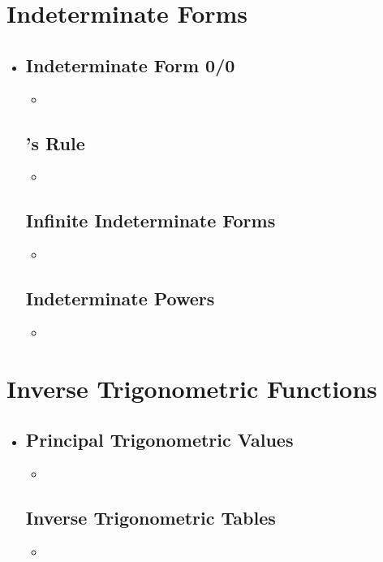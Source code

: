 \section{Indeterminate Forms}
\begin{itemize}
  \item []

  \subsection{Indeterminate Form 0/0}
  \begin{itemize}
    \item 
  \end{itemize}

  \subsection{\hopital's Rule}
  \begin{itemize}
    \item 
  \end{itemize}

  \subsection{Infinite Indeterminate Forms}
  \begin{itemize}
    \item 
  \end{itemize}
  
  \subsection{Indeterminate Powers}
  \begin{itemize}
    \item 
  \end{itemize}
  
\end{itemize}

\section{Inverse Trigonometric Functions}
\begin{itemize}
  \item []
  
  \subsection{Principal Trigonometric Values}
  \begin{itemize}
    \item 
  \end{itemize}
  
  \subsection{Inverse Trigonometric Tables}
  \begin{itemize}
    \item 
  \end{itemize}
  
  
\end{itemize}

